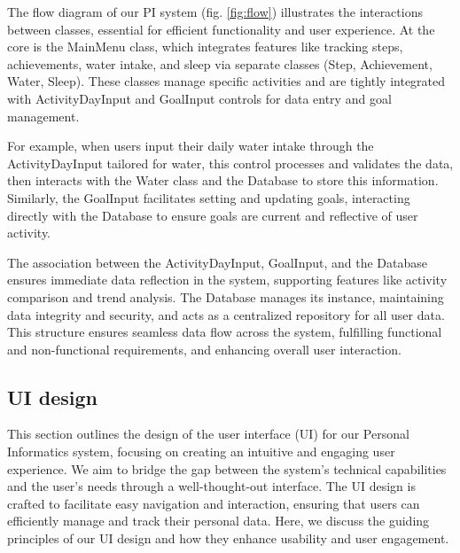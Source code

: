 \documentclass[12pt]{article}
\begin{document}
The flow diagram of our PI system (fig. \ref{fig:flow}) illustrates the
interactions between classes, essential for efficient functionality and user
experience. At the core is the MainMenu class, which integrates features like
tracking steps, achievements, water intake, and sleep via separate classes
(Step, Achievement, Water, Sleep). These classes manage specific activities and
are tightly integrated with ActivityDayInput and GoalInput controls for data
entry and goal management.\par

For example, when users input their daily water intake through the
ActivityDayInput tailored for water, this control processes and validates the
data, then interacts with the Water class and the Database to store this
information. Similarly, the GoalInput facilitates setting and updating goals,
interacting directly with the Database to ensure goals are current and
reflective of user activity.\par

The association between the ActivityDayInput, GoalInput, and the Database
ensures immediate data reflection in the system, supporting features like
activity comparison and trend analysis. The Database manages its instance,
maintaining data integrity and security, and acts as a centralized repository
for all user data. This structure ensures seamless data flow across the system,
fulfilling functional and non-functional requirements, and enhancing overall
user interaction.\par

\subsection{UI design}

This section outlines the design of the user interface (UI) for our Personal 
Informatics system, focusing on creating an intuitive and engaging user experience.
We aim to bridge the gap between the system's technical capabilities and the user's
needs through a well-thought-out interface. The UI design is crafted to facilitate 
easy navigation and interaction, ensuring that users can efficiently manage and 
track their personal data. Here, we discuss the guiding principles of our UI design
and how they enhance usability and user engagement.\par
\end{document}
